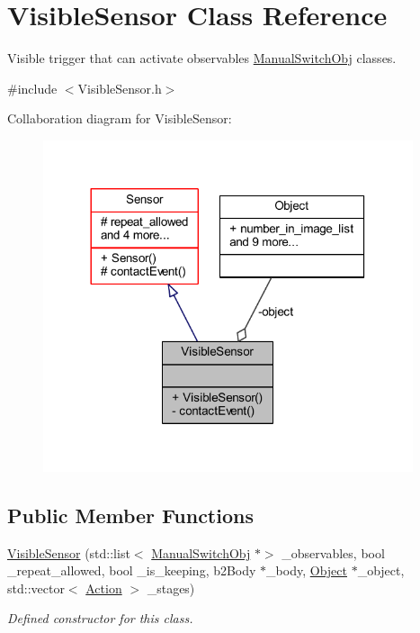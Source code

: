\hypertarget{class_visible_sensor}{}\section{Visible\+Sensor Class Reference}
\label{class_visible_sensor}


Visible trigger that can activate observables \hyperlink{class_manual_switch_obj}{Manual\+Switch\+Obj} classes.  




{\ttfamily \#include $<$Visible\+Sensor.\+h$>$}



Collaboration diagram for Visible\+Sensor\+:
\nopagebreak
\begin{figure}[H]
\begin{center}
\leavevmode
\includegraphics[width=308pt]{class_visible_sensor__coll__graph}
\end{center}
\end{figure}
\subsection*{Public Member Functions}
\begin{DoxyCompactItemize}
\item 
\hyperlink{class_visible_sensor_a74f292ee517c8a41afe163cef670c707}{Visible\+Sensor} (std\+::list$<$ \hyperlink{class_manual_switch_obj}{Manual\+Switch\+Obj} $\ast$$>$ \+\_\+observables, bool \+\_\+repeat\+\_\+allowed, bool \+\_\+is\+\_\+keeping, b2\+Body $\ast$\+\_\+body, \hyperlink{class_object}{Object} $\ast$\+\_\+object, std\+::vector$<$ \hyperlink{_manual_switch_obj_8h_a8bb1ef53467e4f61410d12822d922498}{Action} $>$ \+\_\+stages)
\begin{DoxyCompactList}\small\item\em Defined constructor for this class. \end{DoxyCompactList}\end{DoxyCompactItemize}
